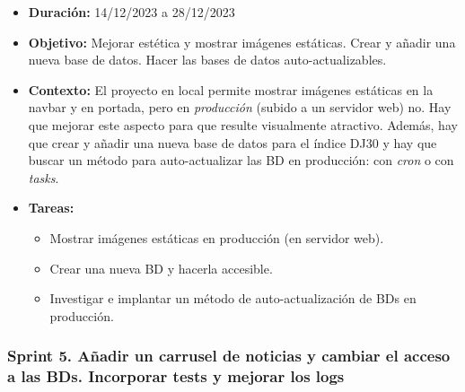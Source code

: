 \begin{itemize}
\item  
\textbf{Duración:} 14/12/2023 a 28/12/2023

\item
\textbf{Objetivo:} Mejorar estética y mostrar imágenes estáticas. Crear y añadir una nueva base de datos. Hacer las bases de datos auto-actualizables.

\item
\textbf{Contexto:} El proyecto en local permite mostrar imágenes estáticas en la navbar y en portada, pero en \emph{producción} (subido a un servidor web) no. Hay que mejorar este aspecto para que resulte visualmente atractivo. Además, hay que crear y añadir una nueva base de datos para el índice DJ30 y hay que buscar un método para auto-actualizar las BD en producción: con \emph{cron}\citep{wiki:cron} o con \emph{tasks}. 

\item
\textbf{Tareas:}
	\begin{itemize}
	\tightlist
	\item 
	Mostrar imágenes estáticas en producción (en servidor web).
	\item 	
	Crear una nueva BD y hacerla accesible. 
	\item 
	Investigar e implantar un método de auto-actualización de BDs en producción. 
  	\end{itemize}
\end{itemize}


\subsubsection{Sprint 5. Añadir un carrusel de noticias y cambiar el acceso a las BDs. Incorporar tests y mejorar los logs}

